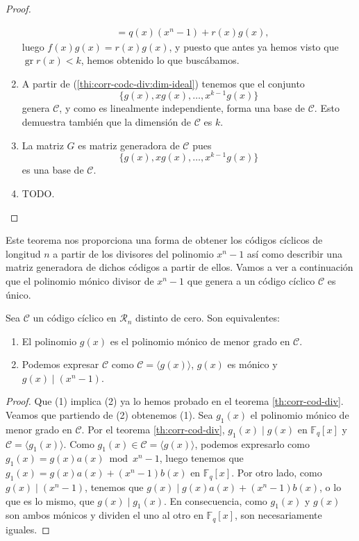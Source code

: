 \begin{proof}
\begin{enumerate}
\begin{align*}
               &= q(x)(x^n - 1) + r(x)g(x),
    \end{align*}
    luego \(f(x)g(x) = r(x)g(x)\), y puesto que antes ya hemos visto que \(\operatorname{gr} r(x) < k\), hemos obtenido lo que buscábamos.
    \item A partir de (\ref{thi:corr-codc-div:dim-ideal}) tenemos que el conjunto \[\{g(x), xg(x), \dots, x^{k-1}g(x)\}\] genera \(\mathcal C\), y como es linealmente independiente, forma una base de \(\mathcal C\).
    Esto demuestra también que la dimensión de \(\mathcal C\) es \(k\).
    \item La matriz \(G\) es matriz generadora de \(\mathcal C\) pues \[\{g(x), xg(x), \dots, x^{k-1}g(x)\}\] es una base de \(\mathcal C\).
    \item TODO. %
  \end{enumerate}
\end{proof}

Este teorema nos proporciona una forma de obtener los códigos cíclicos de longitud \(n\) a partir de los divisores del polinomio \(x^n - 1\) así como describir una matriz generadora de dichos códigos a partir de ellos.
Vamos a ver a continuación que el polinomio mónico divisor de \(x^n - 1\) que genera a un código cíclico \(\mathcal C\) es único.

\begin{corollary}
  \label{cor:pol-gen-unico}
  Sea \(\mathcal C\) un código cíclico en \(\mathcal R_n\) distinto de cero.
  Son equivalentes:
  \begin{enumerate}
    \item El polinomio \(g(x)\) es el polinomio mónico de menor grado en \(\mathcal C\).
    \item Podemos expresar \(\mathcal C\) como \(\mathcal C = \langle g(x)\rangle\), \(g(x)\) es mónico y \(g(x) \mid (x^n -1)\).
  \end{enumerate}
\end{corollary}

\begin{proof}
  Que (1) implica (2) ya lo hemos probado en el teorema \ref{th:corr-cod-div}. 
  Veamos que partiendo de (2) obtenemos (1). 
  Sea \(g_1(x)\) el polinomio mónico de menor grado en \(\mathcal C\).
  Por el teorema \ref{th:corr-cod-div}, \(g_1(x) \mid g(x)\) en \(\mathbb F_q[x]\) y \(\mathcal C = \langle g_1(x)\rangle\).
  Como \(g_1(x) \in \mathcal C = \langle g(x) \rangle\), podemos expresarlo como \(g_1(x) = g(x)a(x) \bmod x^n - 1\), luego tenemos que \(g_1(x) = g(x)a(x) + (x^n - 1)b(x)\) en \(\mathbb F_q[x]\).
  Por otro lado, como \(g(x) \mid (x^n - 1)\), tenemos que \(g(x) \mid g(x)a(x) + (x^n-1)b(x)\), o lo que es lo mismo, que \(g(x) \mid g_1(x)\). 
  En consecuencia, como \(g_1(x)\) y \(g(x)\) son ambos mónicos y dividen el uno al otro en \(\mathbb F_q[x]\), son necesariamente iguales.
\end{proof}

